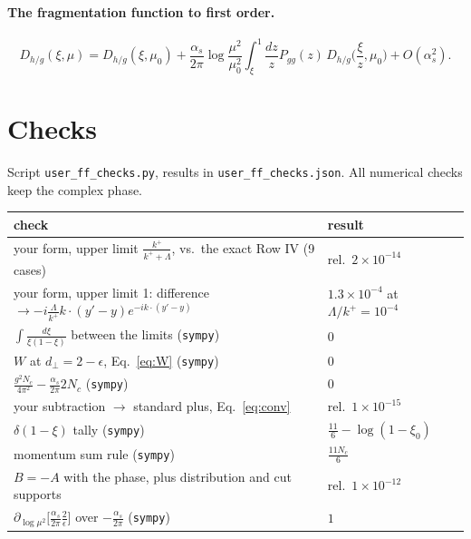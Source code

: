 \documentclass[10pt]{article}
\numberwithin{equation}{section}
\begin{document}
\paragraph{The fragmentation function to first order.}
\begin{equation}
D_{h/g}(\xi,\mu)=D_{h/g}(\xi,\mu_0)+\frac{\alpha_s}{2\pi}\log\frac{\mu^2}{\mu_0^2}\int_\xi^1\frac{dz}{z}P_{gg}(z)\,D_{h/g}\Big(\frac{\xi}{z},\mu_0\Big)+O(\alpha_s^2).
\end{equation}

\section{Checks}
Script \texttt{user\_ff\_checks.py}, results in \texttt{user\_ff\_checks.json}. All numerical checks keep the complex phase.
\begin{center}\small
\begin{tabular}{@{}p{}p{}@{}}\toprule
check & result\\\midrule
your form, upper limit $\frac{k^+}{k^++\Lambda}$, vs.\ the exact Row IV (9 cases) & rel.\ $2\times10^{-14}$\\
your form, upper limit 1: difference $\to-i\frac{\Lambda}{k^+}k\cdot(y'-y)e^{-ik\cdot(y'-y)}$ & $1.3\times10^{-4}$ at $\Lambda/k^+=10^{-4}$\\
$\int\frac{d\xi}{\xi(1-\xi)}$ between the limits (\texttt{sympy}) & $0$\\
$W$ at $d_\perp=2-\epsilon$, Eq.~\eqref{eq:W} (\texttt{sympy}) & $0$\\
$\frac{g^2N_c}{4\pi^2}-\frac{\alpha_s}{2\pi}2N_c$ (\texttt{sympy}) & $0$\\
your subtraction $\to$ standard plus, Eq.~\eqref{eq:conv} & rel.\ $1\times10^{-15}$\\
$\delta(1-\xi)$ tally (\texttt{sympy}) & $\frac{11}{6}-\log(1-\xi_0)$\\
momentum sum rule (\texttt{sympy}) & $\frac{11N_c}{6}$\\
$B=-A$ with the phase, plus distribution and cut supports & rel.\ $1\times10^{-12}$\\
$\partial_{\log\mu^2}\big[\frac{\alpha_s}{2\pi}\frac{2}{\epsilon}\big]$ over $-\frac{\alpha_s}{2\pi}$ (\texttt{sympy}) & $1$\\\bottomrule
\end{tabular}
\end{center}
\end{document}
